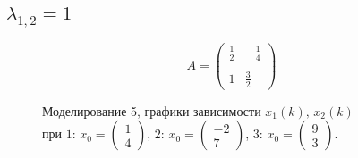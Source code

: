 \documentclass[a5paper, 10pt]{article}
\theoremstyle{definition}
\theoremstyle{plain}
\theoremstyle{remark}
\begin{document}
\subsection{$\lambda_{1, 2} = 1$}
\begin{equation}
A =
\begin{pmatrix}
 \frac{1}{2} &   -\frac{1}{4}\\
\\
1 & \frac{3}{2}
\end{pmatrix}
\end{equation}
\begin{figure}[h!]
\caption{Моделирование 5, графики зависимости $x_1 \left( k \right), \, x_2 \left( k \right)$ \\ при  $1: \, x_0 = \begin{pmatrix} 1 \\ 4 \end{pmatrix}$, $2: \, x_0 = \begin{pmatrix} -2 \\ 7 \end{pmatrix}$, $3: \, x_0 = \begin{pmatrix} 9 \\ 3 \end{pmatrix}$.}
\end{figure}



\end{document}
